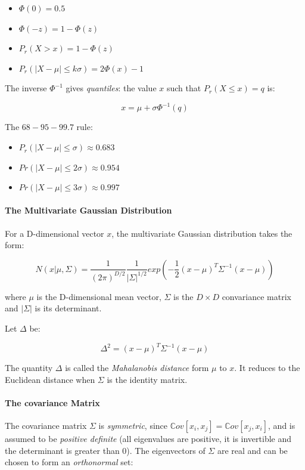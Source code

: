 \documentclass{article}
\begin{document}
\begin{itemize}
\item
  \(\Phi (0) = 0.5\)
\item
  \(\Phi (-z) = 1 - \Phi(z)\)
\item
  \(P_r(X > x) = 1 - \Phi(z)\)
\item
  \(P_r(|X - \mu| \le k \sigma) = 2\Phi (x) - 1\)
\end{itemize}

The inverse \(\Phi^{-1}\) gives \emph{quantiles}: the value \(x\) such
that \(P_r(X\le x) =
q\) is:

\[x = \mu + \sigma \Phi^{-1} (q)\]

The \(68-95-99.7\) rule:

\begin{itemize}
\item
  \(P_r(|X - \mu| \le \sigma) \approx 0.683\)
\item
  \(Pr(|X-\mu | \le 2 \sigma ) \approx 0.954\)
\item
  \(Pr(|X-\mu | \le 3 \sigma ) \approx 0.997\)
\end{itemize}

\paragraph{The Multivariate Gaussian
Distribution}\label{the-multivariate-gaussian-distribution}

For a D-dimensional vector \(x\), the multivariate Gaussian distribution
takes the form:

\[N(x|\mu, \Sigma) = \frac{1}{(2\pi)^{D/2}}
\frac{1}{|\Sigma|^{1/2}}exp(-\frac{1}{2}(x - \mu)^T \Sigma^{-1} (x - \mu))\]

where \(\mu\) is the D-dimensional mean vector, \(\Sigma\) is the
\(D \times D\) convariance matrix and \(|\Sigma|\) is its determinant.

Let \(\Delta\) be:

\[\Delta^2 = (x - \mu)^T \Sigma^{-1} (x - \mu)\]

The quantity \(\Delta\) is called the \emph{Mahalanobis distance} form
\(\mu\) to \(x\). It reduces to the Euclidean distance when \(\Sigma\)
is the identity matrix.

\paragraph{The covariance Matrix}\label{the-covariance-matrix}

The covariance matrix \(\Sigma\) is \emph{symmetric}, since
\(\mathbb{C}ov[x_i, x_j] = \mathbb{C}ov[x_j,
x_i]\), and is assumed to be \emph{positive definite} (all eigenvalues
are positive, it is invertible and the determinant is greater than 0).
The eigenvectors of \(\Sigma\) are real and can be chosen to form an
\emph{orthonormal} set:
\end{document}
